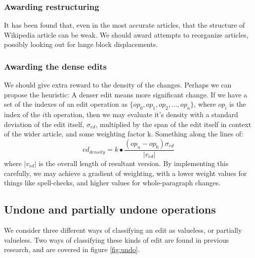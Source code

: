 \documentclass[a4paper,11pt,twoside,notitlepage]{article}
\begin{document}
        \subsubsection*{Awarding restructuring}
        \label{restructuring}
        It has been found that, even in the most accurate articles,
        that the structure of Wikipedia article can be
        weak.\cite{Giles2005} We should award attempts to reorganize
        articles, possibly looking out for lange block displacements.
        
        \subsubsection*{Awarding the dense edits}
        We should give extra reward to the density of the
        changes. Perhaps we can propose the heuristic: A denser edit
        means more significant change. If we have a set
        of the indexes of an edit operation as
        $\{op_0,op_1,op_2,\dots, op_n\}$, where $op_i$ is the index of
        the $i$th operation, then we may evaluate it's density with a
        standard deviation of the edit itself, $\sigma_{ed}$,
        multiplied by the span of the edit itself in context of the
        wider article, and some weighting factor k. Something along
        the lines of:
        $$ed_{density} = k\bullet\frac{(op_n -
          op_0)\sigma_{ed}}{|v_{ed}|}$$ where $|v_{ed}|$ is the overall
        length of resultant version. By implementing this carefully,
        we may achieve a gradient of weighting, with a lower weight
        values for things like spell-checks, and higher values for
        whole-paragraph changes.

        \subsection*{Undone and partially undone operations}
        We consider three different ways of classifying an edit as
        valueless, or partially valueless. Two ways of classifying
        these kinds of edit are found in previous research, and are
        covered in figure \ref{fig:undo}.
\end{document}
